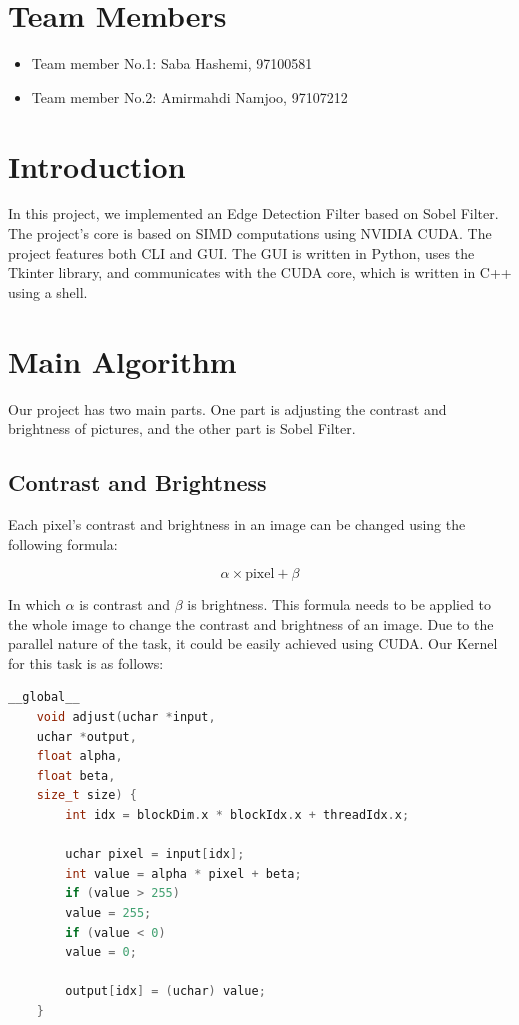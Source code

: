 \documentclass[12pt]{article}
\begin{document}
	
	
		\section{Team Members}
	
	\begin{itemize}
		
		\item Team member No.1: Saba Hashemi, 97100581
		\item Team member No.2: Amirmahdi Namjoo, 97107212
	\end{itemize}
	
\newpage
	\section{Introduction}
	
	
In this project, we implemented an Edge Detection Filter based on Sobel Filter. The project's core is based on SIMD computations using NVIDIA CUDA. The project features both CLI and GUI. The GUI is written in Python, uses the Tkinter library, and communicates with the CUDA core, which is written in C++ using a shell.
\newpage

\section{Main Algorithm}

Our project has two main parts. One part is adjusting the contrast and brightness of pictures, and the other part is Sobel Filter.

\subsection{Contrast and Brightness}

Each pixel's contrast and brightness in an image can be changed using the following formula:

$$\alpha \times \text{pixel} + \beta$$

In which $\alpha$ is contrast and $\beta$ is brightness. This formula needs to be applied to the whole image to change the contrast and brightness of an image. Due to the parallel nature of the task, it could be easily achieved using CUDA. Our Kernel for this task is as follows:

\begin{lstlisting}[language=c++]
	__global__
	void adjust(uchar *input,
	uchar *output,
	float alpha,
	float beta,
	size_t size) {
		int idx = blockDim.x * blockIdx.x + threadIdx.x;
		
		uchar pixel = input[idx];
		int value = alpha * pixel + beta;
		if (value > 255)
		value = 255;
		if (value < 0)
		value = 0;
		
		output[idx] = (uchar) value;
	}
	
\end{lstlisting}
\end{document}
